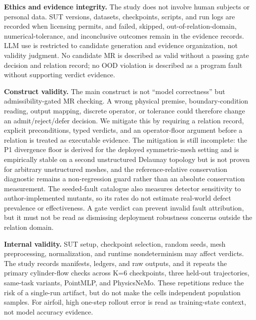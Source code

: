 \documentclass[preprint,12pt]{elsarticle}
\begin{document}
\textbf{Ethics and evidence integrity.} The study does not involve human subjects or personal data. SUT versions, datasets, checkpoints, scripts, and run logs are recorded when licensing permits, and failed, skipped, out-of-relation-domain, numerical-tolerance, and inconclusive outcomes remain in the evidence records. LLM use is restricted to candidate generation and evidence organization, not validity judgment. No candidate MR is described as valid without a passing gate decision and relation record; no OOD violation is described as a program fault without supporting verdict evidence.

\textbf{Construct validity.} The main construct is not ``model correctness'' but admissibility-gated MR checking. A wrong physical premise, boundary-condition reading, output mapping, discrete operator, or tolerance could therefore change an admit/reject/defer decision. We mitigate this by requiring a relation record, explicit preconditions, typed verdicts, and an operator-floor argument before a relation is treated as executable evidence. The mitigation is still incomplete: the P1 divergence floor is derived for the deployed symmetric-mesh setting and is empirically stable on a second unstructured Delaunay topology but is not proven for arbitrary unstructured meshes, and the reference-relative conservation diagnostic remains a non-regression guard rather than an absolute conservation measurement. The seeded-fault catalogue also measures detector sensitivity to author-implemented mutants, so its rates do not estimate real-world defect prevalence or effectiveness. A gate verdict can prevent invalid fault attribution, but it must not be read as dismissing deployment robustness concerns outside the relation domain.

\textbf{Internal validity.} SUT setup, checkpoint selection, random seeds, mesh preprocessing, normalization, and runtime nondeterminism may affect verdicts. The study records manifests, ledgers, and raw outputs, and it repeats the primary cylinder-flow checks across K=6 checkpoints, three held-out trajectories, same-task variants, PointMLP, and PhysicsNeMo. These repetitions reduce the risk of a single-run artifact, but do not make the cells independent population samples. For airfoil, high one-step rollout error is read as training-state context, not model accuracy evidence.
\end{document}

